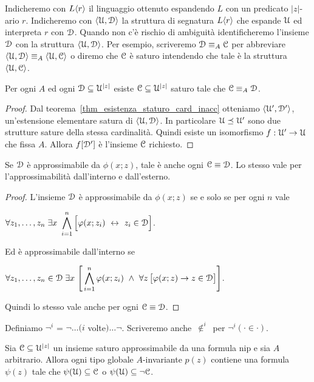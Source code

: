 Indicheremo con $L\langle r\rangle$ il linguaggio ottenuto espandendo $L$ con un predicato $|z|$-ario $r$. Indicheremo con $\langle\EuScript U,\EuScript D\rangle$ la struttura di segnatura $L\langle r\rangle$ che espande $\EuScript U$ ed interpreta $r$ con $\EuScript D$. Quando non c'\`e rischio di ambiguit\`a identificheremo l'insieme $\EuScript D$ con la struttura $\langle\EuScript U,\EuScript D\rangle$. Per esempio, scriveremo $\EuScript D\equiv_A\EuScript C$ per abbreviare $\langle\EuScript U,\EuScript D\rangle\equiv_A\langle\EuScript U,\EuScript C\rangle$ o diremo che $\EuScript C$ \`e saturo intendendo che tale \`e la struttura $\langle\EuScript U,\EuScript C\rangle$.

\begin{proposition}\label{prop_apprx_int_E}
Per ogni $A$ ed ogni $\EuScript D\subseteq\EuScript U^{|z|}$ esiste $\EuScript C\subseteq\EuScript U^{|z|}$ saturo tale che $\EuScript C\equiv_A\EuScript D$.
\end{proposition}

\begin{proof}
Dal teorema~\ref{thm_esistenza_staturo_card_inacc} otteniamo $\langle\EuScript U',\EuScript D'\rangle$, un'estensione elementare satura di  $\langle\EuScript U,\EuScript D\rangle$. In particolare $\EuScript U\preceq\EuScript U'$ sono due strutture sature della stessa cardinalit\`a. Quindi esiste un isomorfismo  $f:\EuScript U'\to\EuScript U$ che fissa $A$. Allora $f[\EuScript D']$ \`e l'insieme $\EuScript C$ richiesto.
\end{proof}


\begin{proposition}\label{prop_apprx_elmentare}
Se $\EuScript D$ \`e approssimabile da $\phi(x;z)$, tale \`e anche ogni $\EuScript C\equiv\EuScript D$. Lo stesso vale per l'approssimabilit\`a dall'interno e dall'esterno.
\end{proposition}
\begin{proof}
L'insieme $\EuScript D$ \`e approssimabile da $\phi(x;z)$ se e solo se per ogni $n$ vale

\hfil$\displaystyle\A z_1,\dots,z_n\;\E x\ \bigwedge^n_{i=1}\Big[\phi(x;z_i)\ \iff\ z_i\in\D\Big]$. 

Ed \`e approssimabile dall'interno se 

\hfil$\displaystyle\A z_1,\dots,z_n\in\D\;\E x\ \Bigg[\bigwedge^n_{i=1}\phi(x;z_i)\ \wedge\ \A z\,\big[\phi(x;z)\imp z\in\D\big]\Bigg]$. 

Quindi lo stesso vale anche per ogni $\EuScript C\equiv\EuScript D$.
\end{proof}



Definiamo \emph{$\neg^i$} =\; 
$\neg\dots(i$ volte$)\dots\neg$.
Scriveremo anche  \emph{$\,\notin^i\,$} per $\neg^i(\cdot\in\cdot)$.


\begin{lemma}\label{lem_tipi_inv}
Sia $\EuScript C\subseteq\EuScript U^{|z|}$ un insieme saturo approssimabile da una formula nip e sia $A$ arbitrario. Allora ogni tipo globale $A$-invariante $p(z)$ contiene una formula $\psi(z)$ tale che $\psi(\EuScript U)\subseteq\EuScript C$ o $\psi(\EuScript U)\subseteq\neg\EuScript C$.
\end{lemma}

